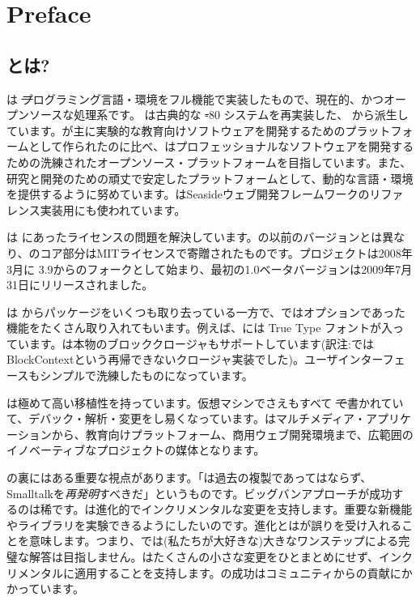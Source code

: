 \documentclass[a4paper,10pt,twoside]{book}
\begin{document}
	\sloppy
	\frontmatter
\fi
\chapter{Preface}

\section*{\pharo とは?}

\pharo は \st プログラミング言語・環境をフル機能で実装したもので、現在的、かつオープンソースな処理系です。 \pharo は古典的な \st-80 システムを再実装した、 \squeak\cite{Inga97a}から派生しています。\squeak が主に実験的な教育向けソフトウェアを開発するためのプラットフォームとして作られたのに比べ、\pharo はプロフェッショナルなソフトウェアを開発するための洗練されたオープンソース・プラットフォームを目指しています。また、研究と開発のための頑丈で安定したプラットフォームとして、動的な言語・環境を提供するように努めています。\pharo はSeasideウェブ開発フレームワークのリファレンス実装用にも使われています。

\pharo は \squeak にあったライセンスの問題を解決しています。\squeak の以前のバージョンとは異なり、\pharo のコア部分はMITライセンスで寄贈されたものです。\pharo プロジェクトは2008年3月に \squeak 3.9からのフォークとして始まり、最初の1.0ベータバージョンは2009年7月31日にリリースされました。

\pharo は \squeak からパッケージをいくつも取り去っている一方で、\squeak ではオプションであった機能をたくさん取り入れてもいます。例えば、\pharo には True Type フォントが入っています。\pharo は本物のブロッククロージャもサポートしています(訳注:\squeak ではBlockContextという再帰できないクロージャ実装でした)。ユーザインターフェースもシンプルで洗練したものになっています。

\pharo は極めて高い移植性を持っています。仮想マシンでさえもすべて \st で書かれていて、デバック・解析・変更をし易くなっています。\pharo はマルチメディア・アプリケーションから、教育向けプラットフォーム、商用ウェブ開発環境まで、広範囲のイノベーティブなプロジェクトの媒体となります。

\pharo の裏にはある重要な視点があります。「\pharo は過去の複製であってはならず、Smalltalkを\emph{再発明}すべきだ」というものです。ビッグバンアプローチが成功するのは稀です。\pharo は進化的でインクリメンタルな変更を支持します。重要な新機能やライブラリを実験できるようにしたいのです。進化とは\pharo が誤りを受け入れることを意味します。つまり、\pharo では(私たちが大好きな)大きなワンステップによる完璧な解答は目指しません。\pharo はたくさんの小さな変更をひとまとめにせず、インクリメンタルに適用することを支持します。\pharo の成功はコミュニティからの貢献にかかっています。
\end{document}

